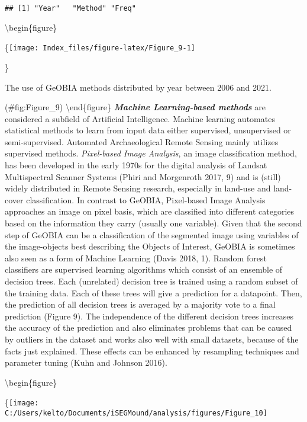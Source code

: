 \documentclass[
]{article}
\begin{document}
\begin{verbatim}
## [1] "Year"   "Method" "Freq"
\end{verbatim}

\textbackslash begin\{figure\}

\{\centering \texttt{[image: Index\_files/figure-latex/Figure\_9-1]}

\}

\caption{The use of GeOBIA methods distributed by year between 2006 and 2021.}

(\#fig:Figure\_9)
\textbackslash end\{figure\}
\textbf{\emph{Machine Learning-based methods}} are considered a subfield of Artificial Intelligence. Machine learning automates statistical methods to learn from input data either supervised, unsupervised or semi-supervised. Automated Archaeological Remote Sensing mainly utilizes supervised methods.
\emph{Pixel-based Image Analysis}, an image classification method, has been developed in the early 1970s for the digital analysis of Landsat Multispectral Scanner Systems (Phiri and Morgenroth 2017, 9) and is (still) widely distributed in Remote Sensing research, especially in land-use and land-cover classification. In contrast to GeOBIA, Pixel-based Image Analysis approaches an image on pixel basis, which are classified into different categories based on the information they carry (usually one variable). Given that the second step of GeOBIA can be a classification of the segmented image using variables of the image-objects best describing the Objects of Interest, GeOBIA is sometimes also seen as a form of Machine Learning (Davis 2018, 1).
Random forest classifiers are supervised learning algorithms which consist of an ensemble of decision trees. Each (unrelated) decision tree is trained using a random subset of the training data. Each of these trees will give a prediction for a datapoint. Then, the prediction of all decision trees is averaged by a majority vote to a final prediction (Figure 9). The independence of the different decision trees increases the accuracy of the prediction and also eliminates problems that can be caused by outliers in the dataset and works also well with small datasets, because of the facts just explained. These effects can be enhanced by resampling techniques and parameter tuning (Kuhn and Johnson 2016).

\textbackslash begin\{figure\}

\{\centering \texttt{[image: C:/Users/kelto/Documents/iSEGMound/analysis/figures/Figure\_10]}
\end{document}
